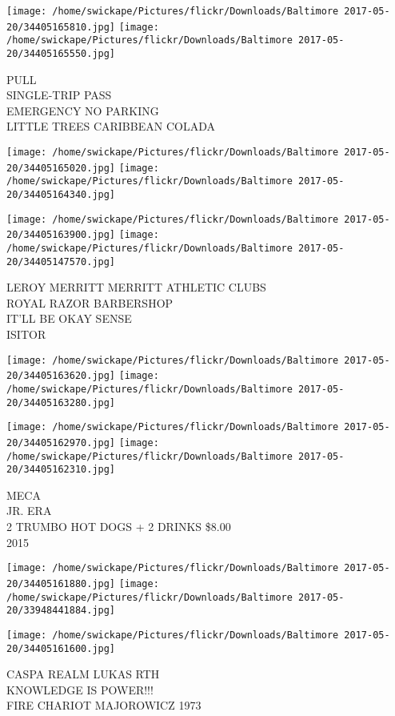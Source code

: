\documentclass[10pt,letterpaper]{article}
\begin{document}
\texttt{[image: /home/swickape/Pictures/flickr/Downloads/Baltimore 2017-05-20/34405165810.jpg]}
\texttt{[image: /home/swickape/Pictures/flickr/Downloads/Baltimore 2017-05-20/34405165550.jpg]}

PULL\\
SINGLE{-}TRIP PASS\\
EMERGENCY NO PARKING\\
LITTLE TREES CARIBBEAN COLADA
\pagebreak

\texttt{[image: /home/swickape/Pictures/flickr/Downloads/Baltimore 2017-05-20/34405165020.jpg]}
\texttt{[image: /home/swickape/Pictures/flickr/Downloads/Baltimore 2017-05-20/34405164340.jpg]}

\texttt{[image: /home/swickape/Pictures/flickr/Downloads/Baltimore 2017-05-20/34405163900.jpg]}
\texttt{[image: /home/swickape/Pictures/flickr/Downloads/Baltimore 2017-05-20/34405147570.jpg]}

LEROY MERRITT MERRITT ATHLETIC CLUBS\\
ROYAL RAZOR BARBERSHOP\\
IT'LL BE OKAY SENSE\\
ISITOR
\pagebreak

\texttt{[image: /home/swickape/Pictures/flickr/Downloads/Baltimore 2017-05-20/34405163620.jpg]}
\texttt{[image: /home/swickape/Pictures/flickr/Downloads/Baltimore 2017-05-20/34405163280.jpg]}

\texttt{[image: /home/swickape/Pictures/flickr/Downloads/Baltimore 2017-05-20/34405162970.jpg]}
\texttt{[image: /home/swickape/Pictures/flickr/Downloads/Baltimore 2017-05-20/34405162310.jpg]}

MECA\\
JR. ERA\\
2 TRUMBO HOT DOGS + 2 DRINKS \$8.00\\
2015
\pagebreak

\texttt{[image: /home/swickape/Pictures/flickr/Downloads/Baltimore 2017-05-20/34405161880.jpg]}
\texttt{[image: /home/swickape/Pictures/flickr/Downloads/Baltimore 2017-05-20/33948441884.jpg]}

\vspace{0.25in}
\texttt{[image: /home/swickape/Pictures/flickr/Downloads/Baltimore 2017-05-20/34405161600.jpg]}

CASPA REALM LUKAS RTH\\
KNOWLEDGE IS POWER!!!\\
FIRE CHARIOT MAJOROWICZ 1973
\pagebreak
\end{document}
